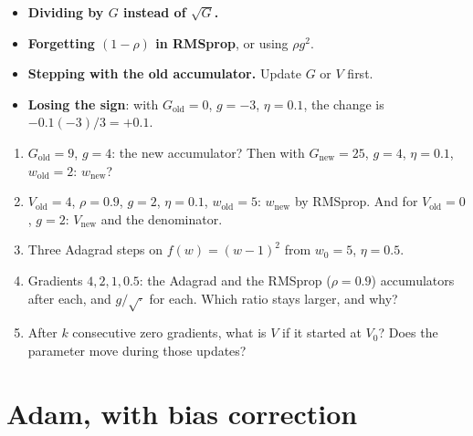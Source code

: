 \documentclass[11pt]{article}
\begin{document}
\begin{caution}
\begin{itemize}
  \item \textbf{Dividing by $G$ instead of $\sqrt{G}$.}
  \item \textbf{Forgetting $(1-\rho)$ in RMSprop}, or using $\rho g^2$.
  \item \textbf{Stepping with the old accumulator.} Update $G$ or $V$ first.
  \item \textbf{Losing the sign}: with $G_{\text{old}} = 0$, $g = -3$, $\eta =
    0.1$, the change is $-0.1(-3)/3 = +0.1$.
\end{itemize}
\end{caution}

\begin{tryit}
\begin{enumerate}[label=\textbf{E6.\arabic*}]
  \item $G_{\text{old}} = 9$, $g = 4$: the new accumulator? Then with
    $G_{\text{new}} = 25$, $g = 4$, $\eta = 0.1$, $w_{\text{old}} = 2$: $w_{\text{new}}$?
  \item $V_{\text{old}} = 4$, $\rho = 0.9$, $g = 2$, $\eta = 0.1$,
    $w_{\text{old}} = 5$: $w_{\text{new}}$ by RMSprop. And for $V_{\text{old}} =
    0$, $g = 2$: $V_{\text{new}}$ and the denominator.
  \item Three Adagrad steps on $f(w) = (w - 1)^2$ from $w_0 = 5$, $\eta = 0.5$.
  \item Gradients $4, 2, 1, 0.5$: the Adagrad and the RMSprop ($\rho = 0.9$)
    accumulators after each, and $g/\sqrt{\cdot}$ for each. Which ratio
    stays larger, and why?
  \item After $k$ consecutive zero gradients, what is $V$ if it started at
    $V_0$? Does the parameter move during those updates?
\end{enumerate}
\end{tryit}

\section{Adam, with bias correction}
\label{sec:adam}
\end{document}
